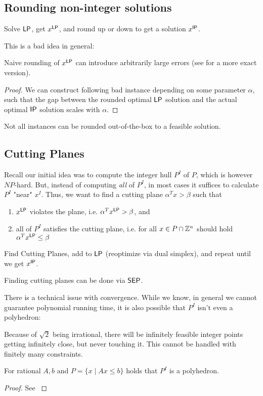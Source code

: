 \subsection{Rounding non-integer solutions}
\begin{idea}
    Solve $\mathsf{LP}$, get $x^{\mathsf{LP}}$, and round up or down to get a solution $x^{\mathsf{IP}}$.
\end{idea}
This is a bad idea in general:
\begin{theorem}
    Naive rounding of $x^{\mathsf{LP}}$ can introduce arbitrarily large errors
    (see \cite[Thm.~5.7]{comb-optimization-korte} for a more exact version).
\end{theorem}
\begin{proof}
    We can construct following bad instance depending on some parameter $\alpha$,
    such that the gap between the rounded optimal $\mathsf{LP}$ solution and the actual optimal $\mathsf{IP}$ solution scales with $\alpha$.
\end{proof}
\begin{remark}
    Not all instances can be rounded out-of-the-box to a feasible solution.
\end{remark}

\subsection{Cutting Planes}
Recall our initial idea was to compute the integer hull $P^I$ of $P$, which is however $NP$-hard.
But, instead of computing \emph{all} of $P^I$, in most cases it suffices to calculate $P^I$ "near" $x^I$.
Thus, we want to find a cutting plane $\alpha^Tx > \beta$ such that
\begin{enumerate}
    \item $x^{\mathsf{LP}}$ violates the plane, i.e. $\alpha^T x^{\mathsf{LP}} > \beta$, and
    \item all of $P^I$ satisfies the cutting plane,
          i.e. for all $x \in P \cap \mathbb{Z}^n$ should hold $\alpha^T x^{\mathsf{LP}} \leq \beta$
\end{enumerate}
\begin{idea}
    Find Cutting Planes, add to $\mathsf{LP}$ (reoptimize via dual simplex), and repeat until we get $x^{\mathsf{IP}}$.
\end{idea}
Finding cutting planes can be done via $\mathsf{SEP}$.
\begin{remark}
    There is a technical issue with convergence. While we know, in general we cannot guarantee polynomial running time,
    it is also possible that $P^I$ isn't even a polyhedron:

    Because of $\sqrt{2}$ being irrational, there will be infinitely feasible integer points
    getting infinitely close, but never touching it. This cannot be handled with finitely many constraints.
\end{remark}
\begin{theorem}
    For rational $A,b$ and $P=\{x \mid Ax \leq b\}$ holds that $P^I$ is a polyhedron.
\end{theorem}
\begin{proof}
    See \cite[Thm.~5.1]{comb-optimization-korte}
\end{proof}